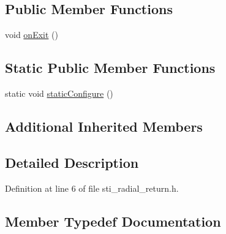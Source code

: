 \subsection*{Public Member Functions}
\begin{DoxyCompactItemize}
\item 
void \hyperlink{structsm__dance__bot_1_1radial__motion__states_1_1StiRadialReturn_ab023b2869f4cdb182fd43bb81bc6dfd0}{on\+Exit} ()
\end{DoxyCompactItemize}
\subsection*{Static Public Member Functions}
\begin{DoxyCompactItemize}
\item 
static void \hyperlink{structsm__dance__bot_1_1radial__motion__states_1_1StiRadialReturn_aa657a5b660ec8ee8e8f100c52d63551d}{static\+Configure} ()
\end{DoxyCompactItemize}
\subsection*{Additional Inherited Members}


\subsection{Detailed Description}


Definition at line 6 of file sti\+\_\+radial\+\_\+return.\+h.



\subsection{Member Typedef Documentation}
\mbox{\label{structsm__dance__bot_1_1radial__motion__states_1_1StiRadialReturn_aa9de7333f73b75189f2693d4fa3f6d57}} 
